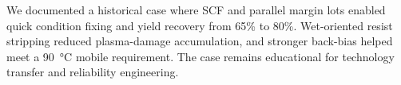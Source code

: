 We documented a historical case where SCF and parallel margin lots enabled quick condition fixing and yield recovery from 65\% to 80\%. Wet-oriented resist stripping reduced plasma-damage accumulation, and stronger back-bias helped meet a 90~\si{\celsius} mobile requirement. The case remains educational for technology transfer and reliability engineering.
